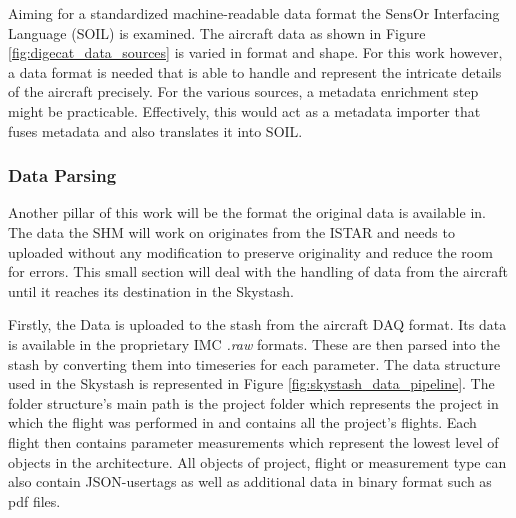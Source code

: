 Aiming for a standardized machine-readable data format the SensOr Interfacing Language (SOIL) is examined. The aircraft data as shown in Figure \ref{fig:digecat_data_sources} is varied in format and shape. For this work however, a data format is needed that is able to handle and represent the intricate details of the aircraft precisely. For the various sources, a metadata enrichment step might be practicable. Effectively, this would act as a metadata importer that fuses metadata and also translates it into SOIL.


\subsubsection{Data Parsing}
Another pillar of this work will be the format the original data is available in. The data the SHM will work on originates from the ISTAR and needs to uploaded without any modification to preserve originality and reduce the room for errors. This small section will deal with the handling of data from the aircraft until it reaches its destination in the Skystash.

Firstly, the Data is uploaded to the stash from the aircraft DAQ format. Its data is available in the proprietary IMC \textit{.raw} formats. These are then parsed into the stash by converting them into timeseries for each parameter. The data structure used in the Skystash is represented in Figure \ref{fig:skystash_data_pipeline}. The folder structure's main path is the project folder which represents the project in which the flight was performed in and contains all the project's flights. Each flight then contains parameter measurements which represent the lowest level of objects in the architecture. All objects of project, flight or measurement type can also contain JSON-usertags as well as additional data in binary format such as pdf files.




